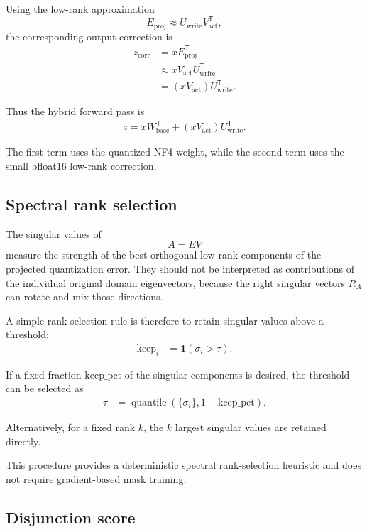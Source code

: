 \documentclass[11pt,a4paper]{article}
\begin{document}
Using the low-rank approximation
\[
E_{\mathrm{proj}}
\approx
U_{\mathrm{write}}V_{\mathrm{act}}^{\mathsf T},
\]
the corresponding output correction is
\begin{align}
z_{\mathrm{corr}}
&=
xE_{\mathrm{proj}}^{\mathsf T}
\\
&\approx
xV_{\mathrm{act}}U_{\mathrm{write}}^{\mathsf T}
\\
&=
(xV_{\mathrm{act}})
U_{\mathrm{write}}^{\mathsf T}.
\end{align}

Thus the hybrid forward pass is
\begin{align}
\boxed{
z
=
xW_{\mathrm{base}}^{\mathsf T}
+
(xV_{\mathrm{act}})
U_{\mathrm{write}}^{\mathsf T}.
}
\end{align}

The first term uses the quantized NF4 weight, while the second term
uses the small bfloat16 low-rank correction.

\subsection{Spectral rank selection}

The singular values of
\[
A=EV
\]
measure the strength of the best orthogonal low-rank components of the
projected quantization error. They should not be interpreted as
contributions of the individual original domain eigenvectors, because
the right singular vectors $R_A$ can rotate and mix those directions.

A simple rank-selection rule is therefore to retain singular values
above a threshold:
\begin{align}
\mathrm{keep}_i
&=
\mathbf{1}(\sigma_i>\tau).
\end{align}

If a fixed fraction $\mathrm{keep\_pct}$ of the singular components is
desired, the threshold can be selected as
\begin{align}
\tau
&=
\operatorname{quantile}
\left(
\{\sigma_i\},
1-\mathrm{keep\_pct}
\right).
\end{align}

Alternatively, for a fixed rank $k$, the $k$ largest singular values
are retained directly.

This procedure provides a deterministic spectral rank-selection
heuristic and does not require gradient-based mask training.

\subsection{Disjunction score}
\end{document}
